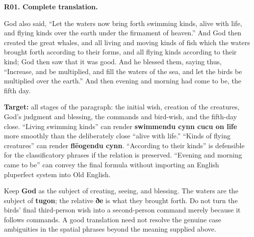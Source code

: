 \par\begin{minipage}{\linewidth}\raggedright
\textbf{R01. Complete translation.}

God also said, “Let the waters now bring forth swimming kinds, alive with life, and flying kinds over the earth under the firmament of heaven.” And God then created the great whales, and all living and moving kinds of fish which the waters brought forth according to their forms, and all flying kinds according to their kind; God then saw that it was good. And he blessed them, saying thus, “Increase, and be multiplied, and fill the waters of the sea, and let the birds be multiplied over the earth.” And then evening and morning had come to be, the fifth day.

\textbf{Target:} all stages of the paragraph: the initial wish, creation of the creatures, God’s judgment and blessing, the commands and bird-wish, and the fifth-day close. “Living swimming kinds” can render \textbf{swimmendu cynn cucu on līfe} more smoothly than the deliberately close “alive with life.” “Kinds of flying creatures” can render \textbf{flēogendu cynn}. “According to their kinds” is defensible for the classificatory phrases if the relation is preserved. “Evening and morning came to be” can convey the final formula without importing an English pluperfect system into Old English.

Keep \textbf{God} as the subject of creating, seeing, and blessing. The waters are the subject of \textbf{tugon}; the relative \textbf{ðe} is what they brought forth. Do not turn the birds’ final third-person wish into a second-person command merely because it follows commands. A good translation need not resolve the genuine case ambiguities in the spatial phrases beyond the meaning supplied above.

\end{minipage}\par\addvspace{4pt}

